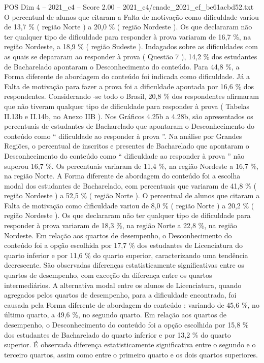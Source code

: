 \begin{textsample}{POS Dim 4 – 2021\_c4 – Score 2.00 – 2021\_c4/enade\_2021\_ef\_be61acbd52.txt}
O percentual de alunos que citaram a Falta de motivação como dificuldade variou de 13,7 \% ( região Norte ) a 20,0 \% ( região Nordeste ).
Os que declararam não ter qualquer tipo de dificuldade para responder à prova variaram de 16,7 \%, na região Nordeste, a 18,9 \% ( região Sudeste ).
Indagados sobre as dificuldades com as quais se depararam ao responder à prova ( Questão 7 ), 14,2 \% dos estudantes de Bacharelado apontaram o Desconhecimento do conteúdo.
Para 44,8 \%, a Forma diferente de abordagem do conteúdo foi indicada como dificuldade.
Já a Falta de motivação para fazer a prova foi a dificuldade apontada por 16,6 \% dos respondentes.
Considerando -se todo o Brasil, 20,8 \% dos respondentes afirmaram que não tiveram qualquer tipo de dificuldade para responder à prova ( Tabelas II.13b e II.14b, no Anexo IIB ).
Nos Gráficos 4.25b a 4.28b, são apresentados os percentuais de estudantes de Bacharelado que apontaram o Desconhecimento do conteúdo como “ dificuldade ao responder à prova ”.
Na análise por Grandes Regiões, o percentual de inscritos e presentes de Bacharelado que apontaram o Desconhecimento do conteúdo como “ dificuldade ao responder à prova ” não superou 16,7 \%.
Os percentuais variaram de 11,4 \%, na região Nordeste a 16,7 \%, na região Norte.
A Forma diferente de abordagem do conteúdo foi a escolha modal dos estudantes de Bacharelado, com percentuais que variaram de 41,8 \% ( região Nordeste ) a 52,5 \% ( região Norte ).
O percentual de alunos que citaram a Falta de motivação como dificuldade variou de 8,0 \% ( região Norte ) a 20,2 \% ( região Nordeste ).
Os que declararam não ter qualquer tipo de dificuldade para responder à prova variaram de 18,3 \%, na região Norte a 22,8 \%, na região Nordeste.
Em relação aos quartos de desempenho, o Desconhecimento do conteúdo foi a opção escolhida por 17,7 \% dos estudantes de Licenciatura do quarto inferior e por 11,6 \% do quarto superior, caracterizando uma tendência decrescente.
São observadas diferenças estatisticamente significativas entre os quartos de desempenho, com exceção da diferença entre os quartos intermediários.
A alternativa modal entre os alunos de Licenciatura, quando agregados pelos quartos de desempenho, para a dificuldade encontrada, foi causada pela Forma diferente de abordagem do conteúdo : variando de 45,6 \%, no último quarto, a 49,6 \%, no segundo quarto.
Em relação aos quartos de desempenho, o Desconhecimento do conteúdo foi a opção escolhida por 15,8 \% dos estudantes de Bacharelado do quarto inferior e por 13,2 \% do quarto superior.
É observada diferença estatisticamente significativa entre o segundo e o terceiro quartos, assim como entre o primeiro quarto e os dois quartos superiores.

\end{textsample}
